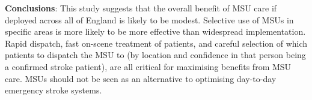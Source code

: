 \textbf{Conclusions}: This study suggests that the overall benefit of MSU care if deployed across all of England is likely to be modest. Selective use of MSUs in specific areas is more likely to be more effective than widespread implementation. Rapid dispatch, fast on-scene treatment of patients, and careful selection of which patients to dispatch the MSU to (by location and confidence in that person being a confirmed stroke patient), are all critical for maximising benefits from MSU care. MSUs should not be seen as an alternative to optimising day-to-day emergency stroke systems.